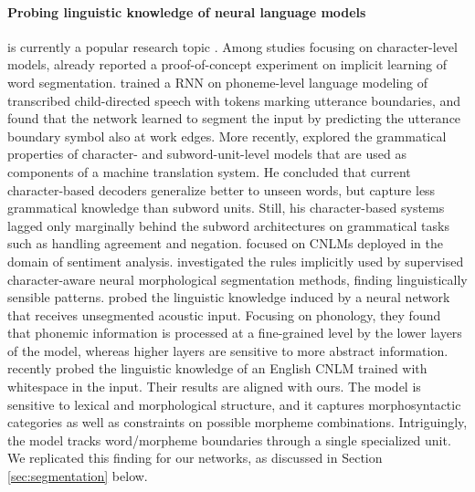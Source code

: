 \paragraph{Probing linguistic knowledge of neural language models} is
currently a popular research topic
\cite{Li:etal:2016,Linzen:etal:2016,Shi:etal:2016,Adi:etal:2017,Belinkov:etal:2017,Kadar:etal:2017,Hupkes:etal:2017,Conneau:etal:2018,Ettinger:etal:2018,Linzen:etal:2018}. Among
studies focusing on character-level models, already
 reported a proof-of-concept experiment on
implicit learning of word
segmentation.  trained a RNN on
phoneme-level language modeling of transcribed child-directed speech
with tokens marking utterance boundaries, and found that the network
learned to segment the input by predicting the utterance boundary
symbol also at work edges. More recently, 
explored the grammatical properties of character- and
subword-unit-level models that are used as components of a machine
translation system. He concluded that current character-based decoders
generalize better to unseen words, but capture less grammatical
knowledge than subword units. Still, his character-based systems
lagged only marginally behind the subword architectures on grammatical
tasks such as handling agreement and
negation.  focused on CNLMs
deployed in the domain of sentiment
analysis.  investigated the rules implicitly
used by supervised character-aware neural morphological segmentation
methods, finding linguistically sensible
patterns.  probed the linguistic knowledge
induced by a neural network that receives unsegmented acoustic
input. Focusing on phonology, they found that phonemic information is
processed at a fine-grained level by the lower layers of the model,
whereas higher layers are sensitive to more abstract
information. %
 recently probed the linguistic
knowledge of an English CNLM trained with whitespace in the
input. Their results are aligned with ours. The model is sensitive to
lexical and morphological structure, and it captures morphosyntactic
categories as well as constraints on possible morpheme
combinations. Intriguingly, the model tracks word/morpheme boundaries
through a single specialized unit. We replicated this finding for our
networks, as discussed in Section \ref{sec:segmentation} below.
